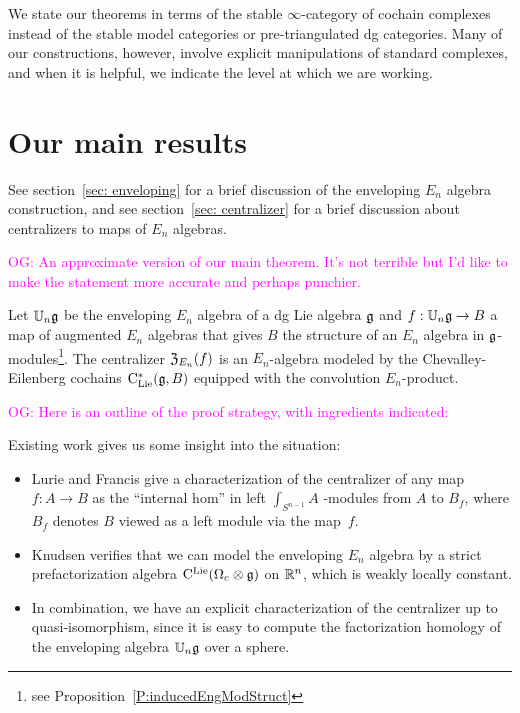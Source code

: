 \documentclass[11pt]{amsart}
\numberwithin{equation}{section}
\def\owen{\textcolor{magenta}{OG: }\textcolor{magenta}}
\begin{document}
\begin{rmk}
We state our theorems in terms of the stable $\infty$-category of cochain complexes 
instead of the stable model categories or pre-triangulated dg categories. 
Many of our constructions, however, involve explicit manipulations of standard complexes, 
and when it is helpful, we indicate the level at which we are working.
\end{rmk}


\section{Our main results}

See section~\ref{sec: enveloping} for a brief discussion of the enveloping $E_n$ algebra construction, and see section~\ref{sec: centralizer} 
for a brief discussion about centralizers to maps of $E_n$ algebras.

\owen{An approximate version of our main theorem. It's not terrible but I'd like to make the statement more accurate and perhaps punchier.}

\begin{thm}
\label{thm: centralizer}
Let $\mathbb U_n \mathfrak g$ be the enveloping $E_n$ algebra of a dg Lie algebra $\mathfrak g$ and $f: \mathbb U_n \mathfrak g \to B$ a map of augmented $E_n$ algebras that gives $B$
the structure of an $E_n$ algebra in $\mathfrak g$-modules\footnote{see Proposition~\ref{P:inducedEngModStruct}}. 
The centralizer ${\frak Z}_{E_n}(f)$ is an $E_n$-algebra modeled by the Chevalley-Eilenberg 
cochains ${\rm C}_{\rm Lie}^*(\mathfrak g, B)$ equipped with the convolution $E_n$-product.
\end{thm}

\owen{Here is an outline of the proof strategy, with ingredients indicated:}

Existing work gives us some insight into the situation:
\begin{itemize}
\item Lurie and Francis give a characterization of the centralizer of any map $f: A \to B$ as the ``internal hom'' in left $\int_{S^{n-1}}A$ -modules from $A$ to $B_f$, where $B_f$ denotes $B$ viewed as a left module via the map~$f$.
\item Knudsen verifies that we can model the enveloping $E_n$ algebra by a strict prefactorization algebra ${\rm C}^{\rm Lie}(\Omega_c \otimes \mathfrak g)$ on $\mathbb R^n$, which is weakly locally constant.
\item In combination, we have an explicit characterization of the centralizer up to quasi-isomorphism, 
since it is easy to compute the factorization homology of the enveloping algebra $\mathbb U_n \mathfrak g$ over a sphere.
\end{itemize}
\end{document}

